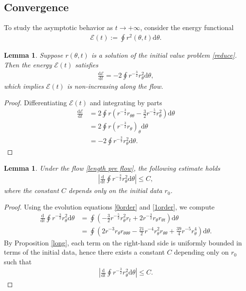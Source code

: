 \documentclass[reqno,11pt, letterpaper]{amsart}
\theoremstyle{plain}
\newtheorem{lem}[thm]{Lemma}
\theoremstyle{definition}
\def\d{\mathrm d}
\numberwithin{equation}{section}
\begin{document}
\subsection{Convergence}
To study the asymptotic behavior as $t\rightarrow+\infty$, consider the energy functional
\begin{align*}
	\mathcal{E}(t):=\oint r^2(\theta,t)\d\theta.
\end{align*}
\begin{lem}\label{E}
	Suppose $ r(\theta,t)$ is a solution of the initial value problem \eqref{reduce}. Then the energy $\mathcal{E}(t)$ satisfies
	\begin{align*}
		\frac{\d\mathcal{E}}{\d t}=-2\oint r^{-\frac{3}{2}} r_\theta^2\d\theta,
	\end{align*}
	which implies $\mathcal{E}(t)$ is non-increasing along the ﬂow.
\end{lem}
\begin{proof}
	Differentiating $\mathcal{E}(t)$ and integrating by parts
	\begin{align*}
		\frac{\d\mathcal{E}}{\d t}&=2\oint r\left( r^{-\frac{3}{2}} r_{\theta\theta}-\frac{3}{2} r^{-\frac{5}{2}} r_\theta^2\right)\d\theta\\
		&=2\oint r\left( r^{-\frac{3}{2}} r_\theta\right)_\theta\d\theta\\
		&=-2\oint r^{-\frac{3}{2}} r_\theta^2\d\theta.
	\end{align*}	
\end{proof}

\begin{lem}\label{derivate bound}
	Under the flow \eqref{length pre flow}, the following estimate holds
	\begin{align*}
		\left\lvert\frac{\d}{\d t}\oint r^{-\frac{3}{2}} r_\theta^2\d\theta\right\rvert\le C,
	\end{align*}
	where the constant $C$ depends only on the initial data $ r_0$. 
\end{lem}
\begin{proof}
	Using the evolution equations \eqref{0order} and \eqref{1order}, we compute
	\begin{align*}
		\frac{\d}{\d t}\oint r^{-\frac{3}{2}} r_\theta^2\d\theta&=\oint\left(-\frac{3}{2}r^{-\frac{5}{2}}r_\theta^2r_t+2r^{-\frac{3}{2}}r_\theta r_{\theta t}\right)\d\theta\\
		&=\oint\left(2r^{-3}r_\theta r_{\theta\theta\theta}-\frac{21}{2}r^{-4}r_\theta^2r_{\theta\theta}+\frac{39}{4}r^{-5}r_\theta^4\right)\d\theta.
	\end{align*}
	By Proposition \ref{long}, each term on the right-hand side is uniformly bounded in terms of the initial data, hence there exists a constant $C$ depending only on $r_0$ such that
	\begin{align*}
		\left\lvert\frac{\d}{\d t}\oint r^{-\frac{3}{2}} r_\theta^2\d\theta\right\rvert\le C.
	\end{align*}
\end{proof}
\end{document}
